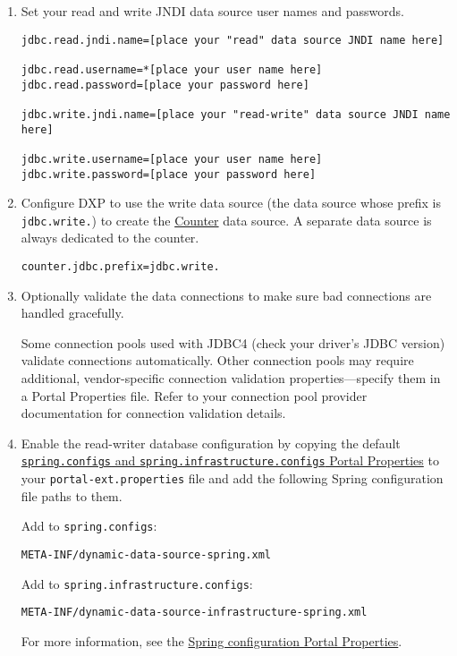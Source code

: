 \begin{enumerate}
\def\labelenumi{\arabic{enumi}.}
\item
  Set your read and write JNDI data source user names and passwords.

\begin{verbatim}
jdbc.read.jndi.name=[place your "read" data source JNDI name here]

jdbc.read.username=*[place your user name here]
jdbc.read.password=[place your password here]

jdbc.write.jndi.name=[place your "read-write" data source JNDI name here]

jdbc.write.username=[place your user name here]
jdbc.write.password=[place your password here]
\end{verbatim}
\item
  Configure DXP to use the write data source (the data source whose
  prefix is \texttt{jdbc.write.}) to create the
  \href{https://docs.liferay.com/portal/7.2-latest/propertiesdoc/portal.properties.html\#Counter}{Counter}
  data source. A separate data source is always dedicated to the
  counter.

\begin{verbatim}
counter.jdbc.prefix=jdbc.write.
\end{verbatim}
\item
  Optionally validate the data connections to make sure bad connections
  are handled gracefully.

  Some connection pools used with JDBC4 (check your driver's JDBC
  version) validate connections automatically. Other connection pools
  may require additional, vendor-specific connection validation
  properties---specify them in a Portal Properties file. Refer to your
  connection pool provider documentation for connection validation
  details.
\item
  Enable the read-writer database configuration by copying the default
  \href{https://docs.liferay.com/portal/7.2-latest/propertiesdoc/portal.properties.html\#Spring}{\texttt{spring.configs}
  and \texttt{spring.infrastructure.configs} Portal Properties} to your
  \texttt{portal-ext.properties} file and add the following Spring
  configuration file paths to them.

  Add to \texttt{spring.configs}:

\begin{verbatim}
META-INF/dynamic-data-source-spring.xml
\end{verbatim}

  Add to \texttt{spring.infrastructure.configs}:

\begin{verbatim}
META-INF/dynamic-data-source-infrastructure-spring.xml
\end{verbatim}

  For more information, see the
  \href{https://docs.liferay.com/portal/7.2-latest/propertiesdoc/portal.properties.html\#Spring}{Spring
  configuration Portal Properties}.
\end{enumerate}


